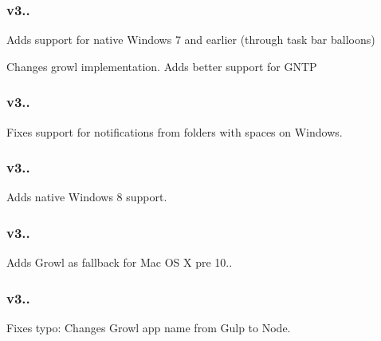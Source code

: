 \subsubsection*{{\ttfamily v3..}}


\begin{DoxyEnumerate}
\item Adds support for native Windows 7 and earlier (through task bar balloons)
\item Changes growl implementation. Adds better support for G\+N\+TP
\end{DoxyEnumerate}

\subsubsection*{{\ttfamily v3..}}


\begin{DoxyEnumerate}
\item Fixes support for notifications from folders with spaces on Windows.
\end{DoxyEnumerate}

\subsubsection*{{\ttfamily v3..}}


\begin{DoxyEnumerate}
\item Adds native Windows 8 support.
\end{DoxyEnumerate}

\subsubsection*{{\ttfamily v3..}}


\begin{DoxyEnumerate}
\item Adds Growl as fallback for Mac OS X pre 10..
\end{DoxyEnumerate}

\subsubsection*{{\ttfamily v3..}}


\begin{DoxyEnumerate}
\item Fixes typo\+: Changes Growl app name from {\ttfamily Gulp} to {\ttfamily Node}.
\end{DoxyEnumerate}

